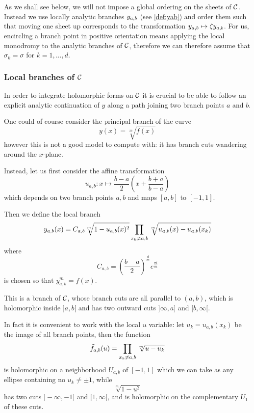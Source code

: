 \documentclass[main.tex]{subfiles}
\begin{document}
  As we shall see below, we
  will not impose a global ordering on the sheets of $\mathcal{C}$. Instead we use
  locally analytic branches $y_{a,b}$ (see \ref{def:yab}) and order them such that
  moving one sheet up corresponds to the transformation $y_{a,b} \mapsto
  \zeta y_{a,b}$. For us, encircling a branch point in positive orientation means
  applying the local monodromy to the analytic branches of $\mathcal{C}$, therefore we
  can therefore assume that $\sigma_k = \sigma$ for $k = 1,\dots,d$.
 
  \subsubsection{Local branches of $\mathcal{C}$}
  
  In order to integrate holomorphic forms on $\mathcal{C}$
  it is crucial to be able to follow an explicit analytic continuation of $y$ along a
  path joining two branch points $a$ and $b$.
  
  One could of course consider the principal branch of the curve
  \begin{equation}
      y(x) = \sqrt[m]{f(x)}
  \end{equation}
  however this is not a good model to compute with: it has branch cuts
  wandering around the $x$-plane.

  Instead, let us first consider the affine transformation
  \begin{equation}
      \label{def:uab}
      u_{a,b} : x \mapsto \frac{b-a}{2}\left(x+\frac{b+a}{b-a}\right) 
  \end{equation}
  which depends on two branch points $a,b$ and maps $[a,b]$ to $[-1,1]$.

  Then we define the local branch
  \begin{equation}
      \label{def:yab}
      y_{a,b}(x) =   C_{a,b} \sqrt[m]{1 - u_{a,b}(x)^2}
      \prod_{x_k\neq a,b}\sqrt[m]{u_{a,b}(x)-u_{a,b}(x_k)}
  \end{equation}
  where
  \begin{equation}
      C_{a,b} = \left(\frac{b-a}{2}\right)^{\frac{d}{m}} e^{\frac{\pi i}{m}}
  \end{equation}
  is chosen so that $y_{a,b}^m = f(x)$.

  This is a branch of $\mathcal{C}$, whose branch cuts are all parallel to $(a,b)$,
  which is holomorphic inside $]a,b[$ and has two outward cuts $]\infty, a]$ and $[b,\infty[$.

  In fact it is convenient to work with the local $u$ variable: let $u_k = u_{a,b}(x_k)$ be the image
  of all branch points, then the function
  \begin{equation}
      \tilde{f}_{a,b}(u) = \prod_{x_k \ne a,b} \sqrt[m]{u - u_k}
  \end{equation}
  is holomorphic on a neighborhood $U_{a,b}$ of $[-1,1]$ which we can take as
  any ellipse containing no $u_k\neq\pm1$, while
  \begin{equation}
      \sqrt[m]{1-u^2}
  \end{equation}
  has two cuts $]-\infty,-1]$ and $[1,\infty[$, and is holomorphic on the complementary
  $U_1$ of these cuts.
\end{document}
